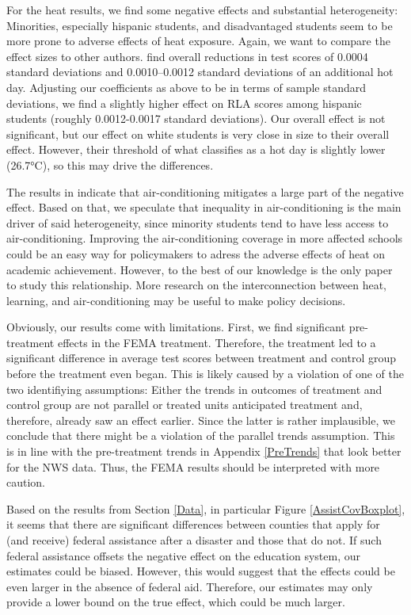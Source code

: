 For the heat results, we find some negative effects and substantial heterogeneity: Minorities, especially hispanic students, and disadvantaged students seem to be more prone to adverse effects of heat exposure. Again, we want to compare the effect sizes to other authors. \cite{Park_2020} find overall reductions in test scores of 0.0004 standard deviations and 0.0010–0.0012 standard deviations of an additional hot day. Adjusting our coefficients as above to be in terms of sample standard deviations, we find a slightly higher effect on RLA scores among hispanic students (roughly 0.0012-0.0017 standard deviations). Our overall effect is not significant, but our effect on white students is very close in size to their overall effect. However, their threshold of what classifies as a hot day is slightly lower (26.7°C), so this may drive the differences.

The results in \cite{Goodman_2020} indicate that air-conditioning mitigates a large part of the negative effect. Based on that, we speculate that inequality in air-conditioning is the main driver of said heterogeneity, since minority students tend to have less access to air-conditioning. Improving the air-conditioning coverage in more affected schools could be an easy way for policymakers to adress the adverse effects of heat on academic achievement. However, to the best of our knowledge \cite{Goodman_2020} is the only paper to study this relationship. More research on the interconnection between heat, learning, and air-conditioning may be useful to make policy decisions.

Obviously, our results come with limitations. First, we find significant pre-treatment effects in the FEMA treatment. Therefore, the treatment led to a significant difference in average test scores between treatment and control group before the treatment even began. This is likely caused by a violation of one of the two identifiying assumptions: Either the trends in outcomes of treatment and control group are not parallel or treated units anticipated treatment and, therefore, already saw an effect earlier. Since the latter is rather implausible, we conclude that there might be a violation of the parallel trends assumption. This is in line with the pre-treatment trends in Appendix \ref{PreTrends} that look better for the NWS data. Thus, the FEMA results should be interpreted with more caution.

Based on the results from Section \ref{Data}, in particular Figure \ref{AssistCovBoxplot}, it seems that there are significant differences between counties that apply for (and receive) federal assistance after a disaster and those that do not. If such federal assistance offsets the negative effect on the education system, our estimates could be biased. However, this would suggest that the effects could be even larger in the absence of federal aid. Therefore, our estimates may only provide a lower bound on the true effect, which could be much larger.

